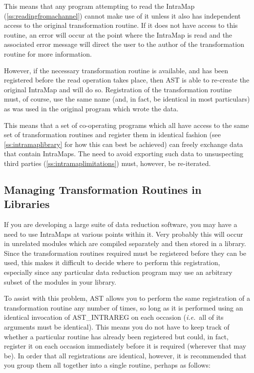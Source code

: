 \documentclass[twoside,11pt]{article}
\newcommand{\htmlref}[2]{#1}
\newcommand{\secref}[1]{\S\ref{#1}}
\renewcommand{\secref}[1]{\ref{#1}}
\begin{document}
This means that any program attempting to read the IntraMap
(\secref{ss:readingfromachannel}) cannot make use of it unless it also
has independent access to the original transformation routine. If it
does not have access to this routine, an error will occur at the point
where the IntraMap is read and the associated error message will
direct the user to the author of the transformation routine for more
information.

However, if the necessary transformation routine is available, and
has been registered before the read operation takes place, then AST is
able to re-create the original IntraMap and will do so. Registration
of the transformation routine must, of course, use the same name
(and, in fact, be identical in most particulars) as was used in the
original program which wrote the data.

This means that a set of co-operating programs which all have access
to the same set of transformation routines and register them in
identical fashion (see \secref{ss:intramaplibrary} for how this can
best be achieved) can freely exchange data that contain IntraMaps. The
need to avoid exporting such data to unsuspecting third parties
(\secref{ss:intramaplimitations}) must, however, be re-iterated.

\subsection{\label{ss:intramaplibrary}Managing Transformation Routines in Libraries}

If you are developing a large suite of data reduction software, you
may have a need to use IntraMaps at various points within it. Very
probably this will occur in unrelated modules which are compiled
separately and then stored in a library. Since the transformation
routines required must be registered before they can be used, this
makes it difficult to decide where to perform this registration,
especially since any particular data reduction program may use an
arbitrary subset of the modules in your library.

To assist with this problem, AST allows you to perform the same
registration of a transformation routine any number of times, so long
as it is performed using an identical invocation of \htmlref{AST\_INTRAREG}{AST_INTRAREG} on
each occasion ({\em{i.e.}}\ all of its arguments must be
identical). This means you do not have to keep track of whether a
particular routine has already been registered but could, in fact,
register it on each occasion immediately before it is required
(wherever that may be). In order that all registrations are identical,
however, it is recommended that you group them all together into a
single routine, perhaps as follows:
\end{document}
